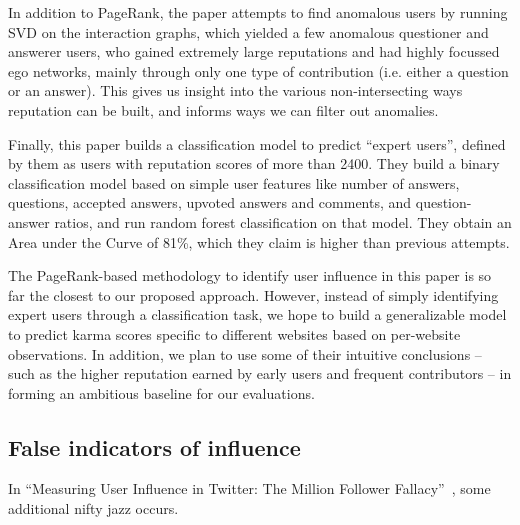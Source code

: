 \documentclass[11pt]{article}
\newcommand{\titlecite}[2]{``#1''~\cite{#2}}
\begin{document}
In addition to PageRank, the paper attempts to find anomalous users by running
SVD on the interaction graphs, which yielded a few anomalous questioner and
answerer users, who gained extremely large reputations and had highly focussed
ego networks, mainly through only one type of contribution (i.e. either a
question or an answer). This gives us insight into the various non-intersecting
ways reputation can be built, and informs ways we can filter out anomalies.

Finally, this paper builds a classification model to predict ``expert users'',
defined by them as users with reputation scores of more than 2400. They build a
binary classification model based on simple user features like number of answers,
questions, accepted answers, upvoted answers and comments, and question-answer
ratios, and run random forest classification on that model. They obtain an Area
under the Curve of 81\%, which they claim is higher than previous attempts.

The PageRank-based methodology to identify user influence in this paper is so
far the closest to our proposed approach. However, instead of simply identifying
expert users through a classification task, we hope to build a generalizable
model to predict karma scores specific to different websites based on
per-website observations.  In addition, we plan to use some of their intuitive
conclusions -- such as the higher reputation earned by early users and frequent
contributors -- in forming an ambitious baseline for our evaluations.

\subsection{False indicators of influence} In \titlecite{Measuring User
Influence in Twitter: The Million Follower Fallacy}{cha2010measuring}, some
additional nifty jazz occurs.
\end{document}
